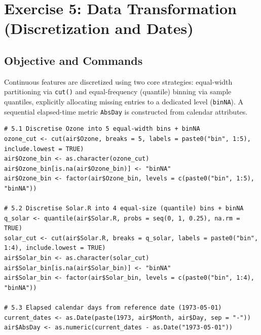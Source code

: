 \documentclass[11pt,a4paper]{article}
\begin{document}
\section{Exercise 5: Data Transformation (Discretization and Dates)}

\subsection{Objective and Commands}
Continuous features are discretized using two core strategies: equal-width partitioning via \texttt{cut()} and equal-frequency (quantile) binning via sample quantiles, explicitly allocating missing entries to a dedicated level (\texttt{binNA}). A sequential elapsed-time metric \texttt{AbsDay} is constructed from calendar attributes.

\begin{lstlisting}
# 5.1 Discretise Ozone into 5 equal-width bins + binNA
ozone_cut <- cut(air$Ozone, breaks = 5, labels = paste0("bin", 1:5), include.lowest = TRUE)
air$Ozone_bin <- as.character(ozone_cut)
air$Ozone_bin[is.na(air$Ozone_bin)] <- "binNA"
air$Ozone_bin <- factor(air$Ozone_bin, levels = c(paste0("bin", 1:5), "binNA"))

# 5.2 Discretise Solar.R into 4 equal-size (quantile) bins + binNA
q_solar <- quantile(air$Solar.R, probs = seq(0, 1, 0.25), na.rm = TRUE)
solar_cut <- cut(air$Solar.R, breaks = q_solar, labels = paste0("bin", 1:4), include.lowest = TRUE)
air$Solar_bin <- as.character(solar_cut)
air$Solar_bin[is.na(air$Solar_bin)] <- "binNA"
air$Solar_bin <- factor(air$Solar_bin, levels = c(paste0("bin", 1:4), "binNA"))

# 5.3 Elapsed calendar days from reference date (1973-05-01)
current_dates <- as.Date(paste(1973, air$Month, air$Day, sep = "-"))
air$AbsDay <- as.numeric(current_dates - as.Date("1973-05-01"))
\end{lstlisting}
\end{document}
